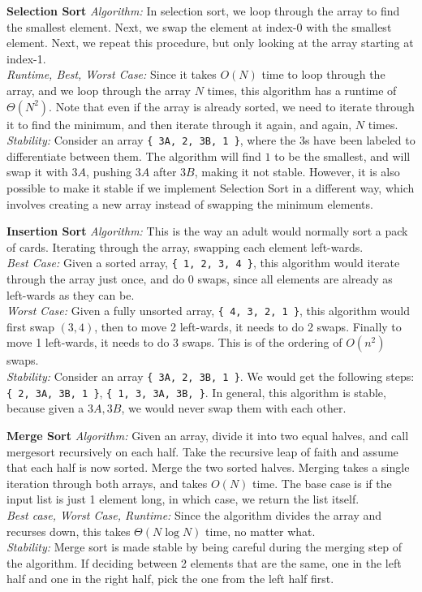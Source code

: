 \begin{solution}
\textbf{Selection Sort}
\textit{Algorithm:} In selection sort, we loop through the array to find the smallest element. Next, we swap the element at index-0 with the smallest element. Next, we repeat this procedure, but only looking at the array starting at index-1. \\
\textit{Runtime, Best, Worst Case:} Since it takes $O(N)$ time to loop through the array, and we loop through the array $N$ times, this algorithm has a runtime of $\Theta(N^2)$. Note that even if the array is already sorted, we need to iterate through it to find the minimum, and then iterate through it again, and again, $N$ times. \\
\textit{Stability:} Consider an array \lstinline${ 3A, 2, 3B, 1 }$, where the $3$s have been labeled to differentiate between them. The algorithm will find $1$ to be the smallest, and will swap it with $3A$, pushing $3A$ after $3B$, making it not stable. However, it is also possible to make it stable if we implement Selection Sort in a different way, which involves creating a new array instead of swapping the minimum elements. 

\textbf{Insertion Sort}
\textit{Algorithm:} This is the way an adult would normally sort a pack of cards. Iterating through the array, swapping each element left-wards. \\
\textit{Best Case:} Given a sorted array, \lstinline${ 1, 2, 3, 4 }$, this algorithm would iterate through the array just once, and do 0 swaps, since all elements are already as left-wards as they can be. \\
\textit{Worst Case:} Given a fully unsorted array, \lstinline${ 4, 3, 2, 1 }$, this algorithm would first swap $(3, 4)$, then to move 2 left-wards, it needs to do 2 swaps. Finally to move 1 left-wards, it needs to do 3 swaps. This is of the ordering of $O(n^2)$ swaps. \\
\textit{Stability:} Consider an array \lstinline${ 3A, 2, 3B, 1 }$. We would get the following steps: \lstinline${ 2, 3A, 3B, 1 }$, \lstinline${ 1, 3, 3A, 3B, }$. In general, this algorithm is stable, because given a $3A, 3B$, we would never swap them with each other. 

\textbf{Merge Sort}
\textit{Algorithm:} Given an array, divide it into two equal halves, and call mergesort recursively on each half. Take the recursive leap of faith and assume that each half is now sorted. Merge the two sorted halves. Merging takes a single iteration through both arrays, and takes $O(N)$ time. The base case is if the input list is just 1 element long, in which case, we return the list itself. \\
\textit{Best case, Worst Case, Runtime:} Since the algorithm divides the array and recurses down, this takes $\Theta(N \log N)$ time, no matter what. \\
\textit{Stability:} Merge sort is made stable by being careful during the merging step of the algorithm. If deciding between 2 elements that are the same, one in the left half and one in the right half, pick the one from the left half first.


\end{solution}

